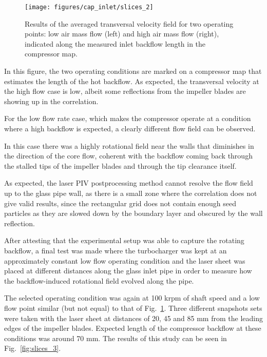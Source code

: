 \begin{figure}[thb!]
\hspace{-0.06\textwidth}
\texttt{[image: figures/cap\_inlet/slices\_2]}
\caption[Transversal velocity fields measured by PIV (flow rate)]{Results of the averaged transversal velocity field for two operating points: low air mass flow (left) and high air mass flow (right), indicated along the measured inlet backflow length in the compressor map.}
\label{fig:slices_2}
\end{figure}

In this figure, the two operating conditions are marked on a compressor map that estimates the length of the hot backflow. As expected, the transversal velocity at the high flow case is low, albeit some reflections from the impeller blades are showing up in the correlation.

For the low flow rate case, which makes the compressor operate at a condition where a high backflow is expected, a clearly different flow field can be observed.

In this case there was a highly rotational field near the walls that diminishes in the direction of the core flow, coherent with the backflow coming back through the stalled tips of the impeller blades and through the tip clearance itself.

As expected, the laser PIV postprocessing method cannot resolve the flow field up to the glass pipe wall, as there is a small zone where the correlation does not give valid results, since the rectangular grid does not contain enough seed particles as they are slowed down by the boundary layer and obscured by the wall reflection.

After attesting that the experimental setup was able to capture the rotating backflow, a final test was made where the turbocharger was kept at an approximately constant low flow operating condition and the laser sheet was placed at different distances along the glass inlet pipe in order to measure how the backflow-induced rotational field evolved along the pipe.

The selected operating condition was again at 100 krpm of shaft speed and a low flow point similar (but not equal) to that of Fig.~\ref{fig:slices_2}. Three different snapshots sets were taken with the laser sheet at distances of 20, 45 and 85 mm from the leading edges of the impeller blades. Expected length of the compressor backflow at these conditions was around 70 mm. The results of this study can be seen in Fig.~\ref{fig:slices_3}.

